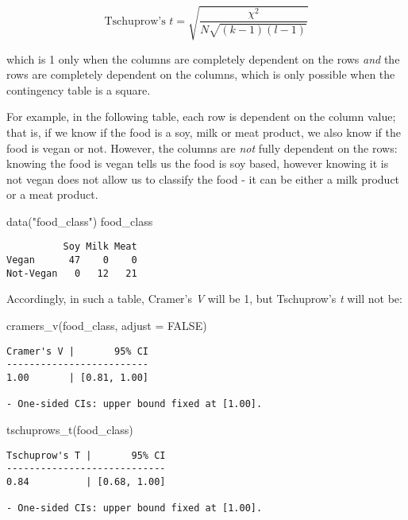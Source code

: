 \documentclass[
]{article}
\newenvironment{Shaded}{\begin{snugshade}}{\end{snugshade}}
\newcommand{\AttributeTok}[1]{\textcolor[rgb]{0.77,0.63,0.00}{#1}}
\newcommand{\ConstantTok}[1]{\textcolor[rgb]{0.00,0.00,0.00}{#1}}
\newcommand{\FunctionTok}[1]{\textcolor[rgb]{0.00,0.00,0.00}{#1}}
\newcommand{\NormalTok}[1]{#1}
\newcommand{\StringTok}[1]{\textcolor[rgb]{0.31,0.60,0.02}{#1}}
\begin{document}
\[
\text{Tschuprow's } t = \sqrt{\frac{\chi^2}{N\sqrt{(k-1)(l-1)}}}
\]

which is 1 only when the columns are completely dependent on the rows
\emph{and} the rows are completely dependent on the columns, which is
only possible when the contingency table is a square.

For example, in the following table, each row is dependent on the column
value; that is, if we know if the food is a soy, milk or meat product,
we also know if the food is vegan or not. However, the columns are
\emph{not} fully dependent on the rows: knowing the food is vegan tells
us the food is soy based, however knowing it is not vegan does not allow
us to classify the food - it can be either a milk product or a meat
product.

\begin{Shaded}
\begin{Highlighting}[]
\FunctionTok{data}\NormalTok{(}\StringTok{"food\_class"}\NormalTok{)}
\NormalTok{food\_class}
\end{Highlighting}
\end{Shaded}

\begin{verbatim}
          Soy Milk Meat
Vegan      47    0    0
Not-Vegan   0   12   21
\end{verbatim}

Accordingly, in such a table, Cramer's \emph{V} will be 1, but
Tschuprow's \emph{t} will not be:

\begin{Shaded}
\begin{Highlighting}[]
\FunctionTok{cramers\_v}\NormalTok{(food\_class, }\AttributeTok{adjust =} \ConstantTok{FALSE}\NormalTok{)}
\end{Highlighting}
\end{Shaded}

\begin{verbatim}
Cramer's V |       95% CI
-------------------------
1.00       | [0.81, 1.00]

- One-sided CIs: upper bound fixed at [1.00].
\end{verbatim}

\begin{Shaded}
\begin{Highlighting}[]
\FunctionTok{tschuprows\_t}\NormalTok{(food\_class)}
\end{Highlighting}
\end{Shaded}

\begin{verbatim}
Tschuprow's T |       95% CI
----------------------------
0.84          | [0.68, 1.00]

- One-sided CIs: upper bound fixed at [1.00].
\end{verbatim}
\end{document}
